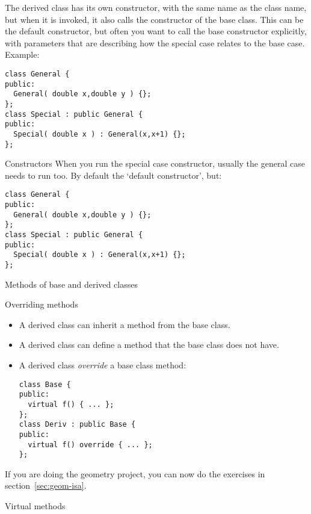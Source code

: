 The derived class has its own constructor, with the same name as the
class name, but when it is invoked, it also calls the constructor of
the base class. This can be the default constructor, but often you
want to call the base constructor explicitly, with parameters that are
describing how the special case relates to the base case. Example:
\begin{verbatim}
class General {
public:
  General( double x,double y ) {};
};
class Special : public General {
public:
  Special( double x ) : General(x,x+1) {};
};
\end{verbatim}

\begin{slide}{Constructors}
  \label{sl:obj-derive-construct}
  When you run the special case constructor, usually the general case
  needs to run too. By default the `default constructor', but:
\begin{verbatim}
class General {
public:
  General( double x,double y ) {};
};
class Special : public General {
public:
  Special( double x ) : General(x,x+1) {};
};
\end{verbatim}
\end{slide}

 {Methods of base and derived classes}
\label{sec:derive-method}

\begin{block}{Overriding methods}
  \label{sl:obj-method-override}
  \begin{itemize}
  \item A derived class can inherit a method from the base class.
  \item A derived class can define a method that the base class does
    not have.
  \item A derived class \emph{override} a
    base class method:
\begin{verbatim}
class Base {
public:
  virtual f() { ... };
};
class Deriv : public Base {
public:
  virtual f() override { ... };
};
\end{verbatim}
  \end{itemize}
\end{block}

\begin{exercise}
  If you are doing the geometry project, 
  you can now do the exercises in section~\ref{sec:geom-isa}.
\end{exercise}

 {Virtual methods}

